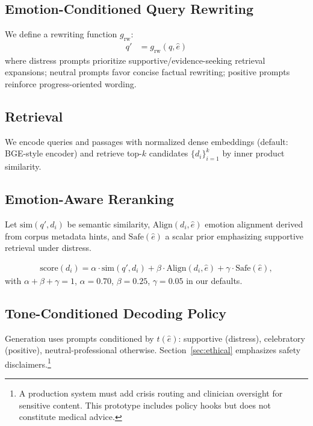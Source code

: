 \documentclass[conference]{IEEEtran}
\begin{document}
\subsection{Emotion-Conditioned Query Rewriting}
We define a rewriting function $g_{\mathrm{rw}}$:
\begin{align}
q' &= g_{\mathrm{rw}}(q, \hat{e})
\end{align}
where distress prompts prioritize supportive/evidence-seeking retrieval expansions; neutral prompts favor concise factual rewriting; positive prompts reinforce progress-oriented wording.

\subsection{Retrieval}
We encode queries and passages with normalized dense embeddings (default: BGE-style encoder) and retrieve top-$k$ candidates $\{d_i\}_{i=1}^k$ by inner product similarity.

\subsection{Emotion-Aware Reranking}
Let $\mathrm{sim}(q',d_i)$ be semantic similarity, $\mathrm{Align}(d_i,\hat{e})$ emotion alignment derived from corpus metadata hints, and $\mathrm{Safe}(\hat{e})$ a scalar prior emphasizing supportive retrieval under distress.

\begin{align}
\text{score}(d_i)=\alpha\cdot \mathrm{sim}(q',d_i) + \beta\cdot \mathrm{Align}(d_i,\hat{e}) + \gamma\cdot \mathrm{Safe}(\hat{e}),
\end{align}
with $\alpha+\beta+\gamma=1$, $\alpha=0.70$, $\beta=0.25$, $\gamma=0.05$ in our defaults.

\subsection{Tone-Conditioned Decoding Policy}
Generation uses prompts conditioned by $t(\hat{e})$: supportive (distress), celebratory (positive), neutral-professional otherwise. Section~\ref{sec:ethical} emphasizes safety disclaimers.\footnote{A production system must add crisis routing and clinician oversight for sensitive content. This prototype includes policy hooks but does not constitute medical advice.}
\end{document}
